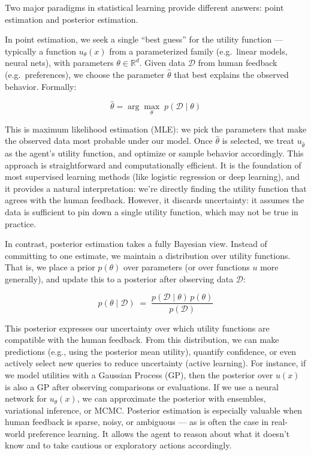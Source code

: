 \documentclass[
  letterpaper,
  numbers=noenddot,
  DIV=11]{scrreprt}
\theoremstyle{plain}
\theoremstyle{definition}
\theoremstyle{remark}
\begin{document}
Two major paradigms in statistical learning provide different answers:
point estimation and posterior estimation.

In point estimation, we seek a single ``best guess'' for the utility
function --- typically a function \(u_\theta(x)\) from a parameterized
family (e.g.~linear models, neural nets), with parameters
\(\theta \in \mathbb{R}^d\). Given data \(\mathcal{D}\) from human
feedback (e.g.~preferences), we choose the parameter \(\hat{\theta}\)
that best explains the observed behavior. Formally:

\[
\hat{\theta} = \arg\max_\theta \; p(\mathcal{D} \mid \theta)
\]

This is maximum likelihood estimation (MLE): we pick the parameters that
make the observed data most probable under our model. Once
\(\hat{\theta}\) is selected, we treat \(u_{\hat{\theta}}\) as the
agent's utility function, and optimize or sample behavior accordingly.
This approach is straightforward and computationally efficient. It is
the foundation of most supervised learning methods (like logistic
regression or deep learning), and it provides a natural interpretation:
we're directly finding the utility function that agrees with the human
feedback. However, it discards uncertainty: it assumes the data is
sufficient to pin down a single utility function, which may not be true
in practice.

In contrast, posterior estimation takes a fully Bayesian view. Instead
of committing to one estimate, we maintain a distribution over utility
functions. That is, we place a prior \(p(\theta)\) over parameters (or
over functions \(u\) more generally), and update this to a posterior
after observing data \(\mathcal{D}\):

\[
p(\theta \mid \mathcal{D}) \;=\; \frac{p(\mathcal{D} \mid \theta)\, p(\theta)}{p(\mathcal{D})}
\]

This posterior expresses our uncertainty over which utility functions
are compatible with the human feedback. From this distribution, we can
make predictions (e.g., using the posterior mean utility), quantify
confidence, or even actively select new queries to reduce uncertainty
(active learning). For instance, if we model utilities with a Gaussian
Process (GP), then the posterior over \(u(x)\) is also a GP after
observing comparisons or evaluations. If we use a neural network for
\(u_\theta(x)\), we can approximate the posterior with ensembles,
variational inference, or MCMC. Posterior estimation is especially
valuable when human feedback is sparse, noisy, or ambiguous --- as is
often the case in real-world preference learning. It allows the agent to
reason about what it doesn't know and to take cautious or exploratory
actions accordingly.
\end{document}
